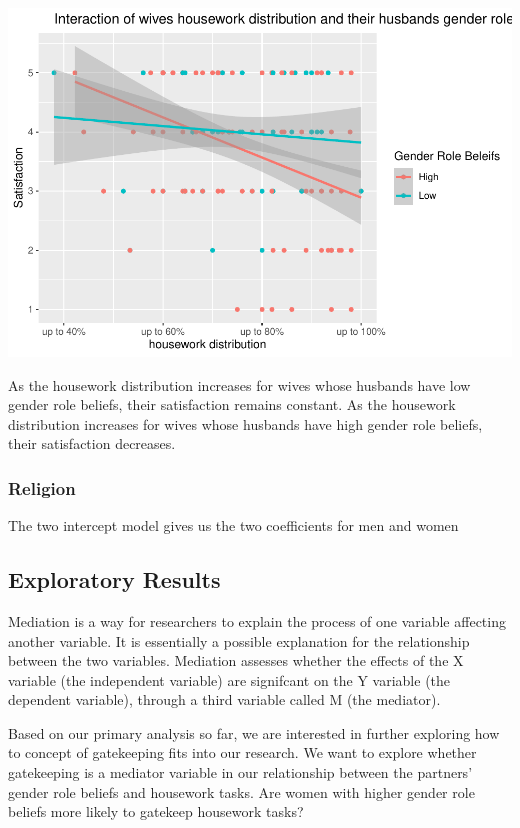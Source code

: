 \documentclass[
  english,
  man,floatsintext]{apa6}
\begin{document}
\includegraphics{results_files/figure-latex/unnamed-chunk-10-1.pdf}

As the housework distribution increases for wives whose husbands have low gender role beliefs, their satisfaction remains constant. As the housework distribution increases for wives whose husbands have high gender role beliefs, their satisfaction decreases.

\hypertarget{religion}{%
\subsubsection{Religion}\label{religion}}

The two intercept model gives us the two coefficients for men and women

\hypertarget{exploratory-results}{%
\subsection{Exploratory Results}\label{exploratory-results}}

Mediation is a way for researchers to explain the process of one variable affecting another variable. It is essentially a possible explanation for the relationship between the two variables. Mediation assesses whether the effects of the X variable (the independent variable) are signifcant on the Y variable (the dependent variable), through a third variable called M (the mediator).

Based on our primary analysis so far, we are interested in further exploring how to concept of gatekeeping fits into our research. We want to explore whether gatekeeping is a mediator variable in our relationship between the partners' gender role beliefs and housework tasks. Are women with higher gender role beliefs more likely to gatekeep housework tasks?
\end{document}
